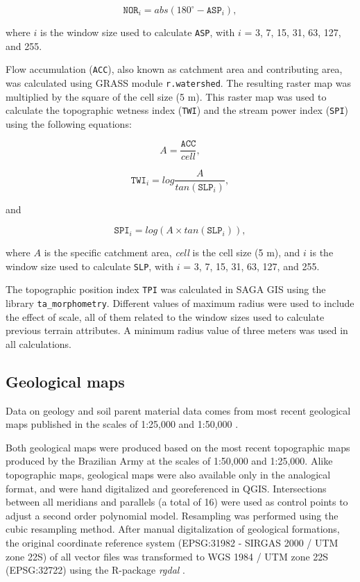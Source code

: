 \begin{equation}
  \texttt{NOR}_i = abs(180^\circ - \texttt{ASP}_i),
\end{equation}\label{eq:NOR}

\noindent where $i$ is the window size used to calculate \texttt{ASP}, with $i$ = 3, 7, 15, 31, 63, 127, and 255.   

Flow accumulation (\texttt{ACC}), also known as catchment area and contributing area, was calculated using GRASS module \texttt{r.watershed}. The resulting raster map was multiplied by the square of the cell size (5 m). This raster map was used to calculate the topographic wetness index (\texttt{TWI}) and the stream power index (\texttt{SPI}) using the following equations:

\begin{equation}
  A = \dfrac{\texttt{ACC}}{\textit{cell}},
\end{equation}\label{eq:sACC}

\begin{equation}
  \texttt{TWI}_i = log \dfrac{A}{tan(\texttt{SLP}_i)},
\end{equation}\label{eq:TWI}

\noindent and

\begin{equation}
  \texttt{SPI}_i = log(A \times tan(\texttt{SLP}_i)),
\end{equation}\label{eq:SPI}

\noindent where $A$ is the specific catchment area, \textit{cell} is the cell size (5 m), and $i$ is the window size used to calculate \texttt{SLP}, with $i$ = 3, 7, 15, 31, 63, 127, and 255.

The topographic position index \texttt{TPI} was calculated in SAGA GIS using the library \texttt{ta\_morphometry}. Different values of maximum radius were used to include the effect of scale, all of them related to the window sizes used to calculate previous terrain attributes. A minimum radius value of three meters was used in all calculations.

\tocless\subsection{Geological maps} 

Data on geology and soil parent material data comes from most recent geological maps published in the scales of 1:25,000 \cite{MacielFilho1990} and 1:50,000 \cite{GasparettoEtAl1988}.

Both geological maps were produced based on the most recent topographic maps produced by the Brazilian Army at the scales of 1:50,000 and 1:25,000. Alike topographic maps, geological maps were also available only in the analogical format, and were hand digitalized and georeferenced in QGIS. Intersections between all meridians and parallels (a total of 16) were used as control points to adjust a second order polynomial model. Resampling was performed using the cubic resampling method. After manual digitalization of geological formations, the original coordinate reference system (EPSG:31982 - SIRGAS 2000 / UTM zone 22S) of all vector files was transformed to WGS 1984 / UTM zone 22S (EPSG:32722) using the R-package \textit{rgdal} \cite{BivandEtAl2013a}.


